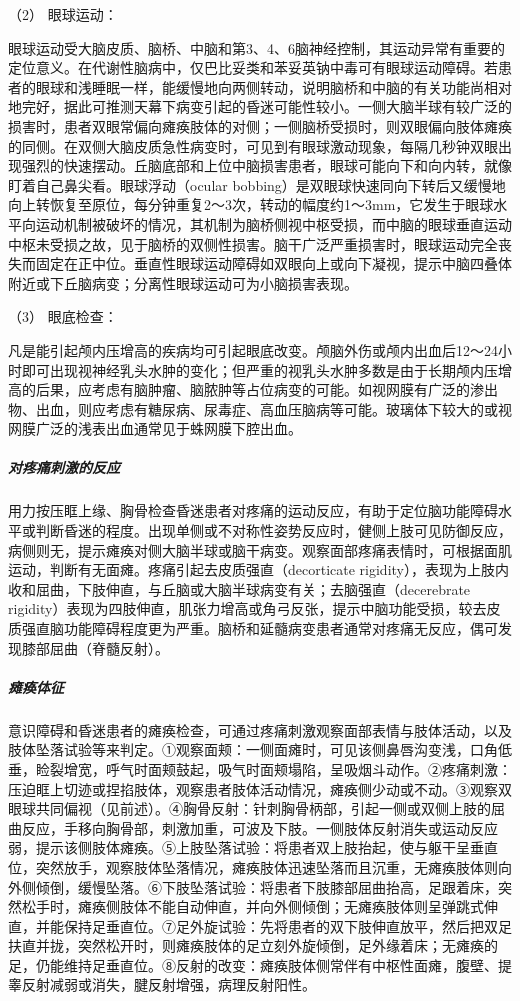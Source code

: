 \hypertarget{text00010.htmlux5cux23CHP1-2-2-1-3-1-2}{}
（2） 眼球运动：

眼球运动受大脑皮质、脑桥、中脑和第3、4、6脑神经控制，其运动异常有重要的定位意义。在代谢性脑病中，仅巴比妥类和苯妥英钠中毒可有眼球运动障碍。若患者的眼球和浅睡眠一样，能缓慢地向两侧转动，说明脑桥和中脑的有关功能尚相对地完好，据此可推测天幕下病变引起的昏迷可能性较小。一侧大脑半球有较广泛的损害时，患者双眼常偏向瘫痪肢体的对侧；一侧脑桥受损时，则双眼偏向肢体瘫痪的同侧。在双侧大脑皮质急性病变时，可见到有眼球激动现象，每隔几秒钟双眼出现强烈的快速摆动。丘脑底部和上位中脑损害患者，眼球可能向下和向内转，就像盯着自己鼻尖看。眼球浮动（ocular
bobbing）是双眼球快速同向下转后又缓慢地向上转恢复至原位，每分钟重复2～3次，转动的幅度约1～3mm，它发生于眼球水平向运动机制被破坏的情况，其机制为脑桥侧视中枢受损，而中脑的眼球垂直运动中枢未受损之故，见于脑桥的双侧性损害。脑干广泛严重损害时，眼球运动完全丧失而固定在正中位。垂直性眼球运动障碍如双眼向上或向下凝视，提示中脑四叠体附近或下丘脑病变；分离性眼球运动可为小脑损害表现。

\hypertarget{text00010.htmlux5cux23CHP1-2-2-1-3-1-3}{}
（3） 眼底检查：

凡是能引起颅内压增高的疾病均可引起眼底改变。颅脑外伤或颅内出血后12～24小时即可出现视神经乳头水肿的变化；但严重的视乳头水肿多数是由于长期颅内压增高的后果，应考虑有脑肿瘤、脑脓肿等占位病变的可能。如视网膜有广泛的渗出物、出血，则应考虑有糖尿病、尿毒症、高血压脑病等可能。玻璃体下较大的或视网膜广泛的浅表出血通常见于蛛网膜下腔出血。

\subparagraph{对疼痛刺激的反应}

用力按压眶上缘、胸骨检查昏迷患者对疼痛的运动反应，有助于定位脑功能障碍水平或判断昏迷的程度。出现单侧或不对称性姿势反应时，健侧上肢可见防御反应，病侧则无，提示瘫痪对侧大脑半球或脑干病变。观察面部疼痛表情时，可根据面肌运动，判断有无面瘫。疼痛引起去皮质强直（decorticate
rigidity），表现为上肢内收和屈曲，下肢伸直，与丘脑或大脑半球病变有关；去脑强直（decerebrate
rigidity）表现为四肢伸直，肌张力增高或角弓反张，提示中脑功能受损，较去皮质强直脑功能障碍程度更为严重。脑桥和延髓病变患者通常对疼痛无反应，偶可发现膝部屈曲（脊髓反射）。

\subparagraph{瘫痪体征}

意识障碍和昏迷患者的瘫痪检查，可通过疼痛刺激观察面部表情与肢体活动，以及肢体坠落试验等来判定。①观察面颊：一侧面瘫时，可见该侧鼻唇沟变浅，口角低垂，睑裂增宽，呼气时面颊鼓起，吸气时面颊塌陷，呈吸烟斗动作。②疼痛刺激：压迫眶上切迹或捏掐肢体，观察患者肢体活动情况，瘫痪侧少动或不动。③观察双眼球共同偏视（见前述）。④胸骨反射：针刺胸骨柄部，引起一侧或双侧上肢的屈曲反应，手移向胸骨部，刺激加重，可波及下肢。一侧肢体反射消失或运动反应弱，提示该侧肢体瘫痪。⑤上肢坠落试验：将患者双上肢抬起，使与躯干呈垂直位，突然放手，观察肢体坠落情况，瘫痪肢体迅速坠落而且沉重，无瘫痪肢体则向外侧倾倒，缓慢坠落。⑥下肢坠落试验：将患者下肢膝部屈曲抬高，足跟着床，突然松手时，瘫痪侧肢体不能自动伸直，并向外侧倾倒；无瘫痪肢体则呈弹跳式伸直，并能保持足垂直位。⑦足外旋试验：先将患者的双下肢伸直放平，然后把双足扶直并拢，突然松开时，则瘫痪肢体的足立刻外旋倾倒，足外缘着床；无瘫痪的足，仍能维持足垂直位。⑧反射的改变：瘫痪肢体侧常伴有中枢性面瘫，腹壁、提睾反射减弱或消失，腱反射增强，病理反射阳性。

